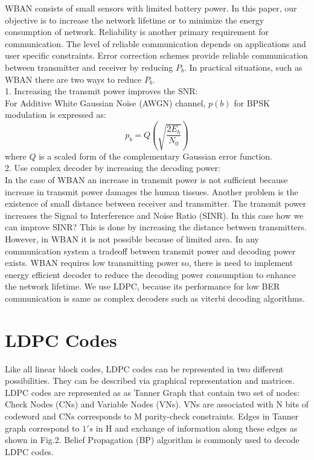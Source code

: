 \documentclass[3p,times,procedia]{elsarticle}
\begin{document}
WBAN consists of small sensors with limited battery power. In this paper, our objective is to increase the network lifetime or to minimize the energy consumption of network. Reliability is another primary requirement for communication. The level of reliable communication depends on applications and user specific constraints. Error correction schemes provide reliable communication between transmitter and receiver by reducing $P_b$. In practical situations, such as WBAN there are two ways to reduce $P_b$.\\
1. Increasing the transmit power improves the SNR:\\
For Additive White Gaussian Noise (AWGN) channel, $p(b)$ for BPSK modulation is expressed as:
\begin{equation}
p_b=Q(\sqrt{\frac{2E_b}{N_0}})
\end{equation}
where $Q$ is a scaled form of the complementary Gaussian error function.\\
2. Use complex decoder by increasing the decoding power:\\
In the case of WBAN an increase in transmit power is not sufficient because increase in transmit power damages the human tissues. Another problem is the existence of small distance between receiver and transmitter. The transmit power increases the Signal to Interference and Noise Ratio (SINR). In this case how we can improve SINR? This is done by increasing the distance between transmitters. However, in WBAN it is not possible because of limited area. In any communication system a tradeoff between transmit power and decoding power exists. WBAN requires low transmitting power so, there is need to implement energy efficient decoder to reduce the decoding power consumption to enhance the network lifetime. We use LDPC, because its performance for low BER communication is same as complex decoders such as viterbi decoding algorithms.

\vspace{-0.5cm}
\section{LDPC Codes}
\vspace{-0.3cm}
\label{sec:pagestyle}


Like all linear block codes, LDPC codes can be represented in two different possibilities. They  can be described via graphical representation and matrices. LDPC codes are represented as as Tanner Graph that contain two set of nodes: Check Nodes (CNs) and Variable Nodes (VNs). VNs are associated with N bits of codeword and CNs corresponds to M parity-check constraints. Edges in Tanner graph correspond to $1's$ in H and exchange of information along these edges as shown in Fig.2. Belief Propagation (BP) algorithm is commonly used to decode LDPC codes.
\end{document}
